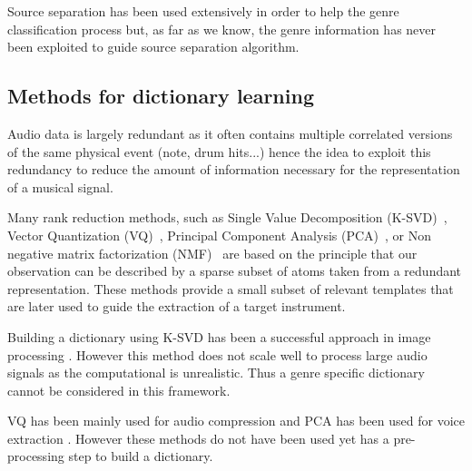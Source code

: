\documentclass{article}
\begin{document}
Source separation has been used extensively in order to help the genre classification process \cite{rump2010autoregressive,lampropoulos2005musical} but, as far as we know, the genre information has never been exploited to guide source separation algorithm. 


\subsection{Methods for dictionary learning}


Audio data is largely redundant as it often contains multiple correlated versions of the same physical event (note, drum hits...) \cite{tovsic2011dictionary} hence the idea to exploit this redundancy to reduce the amount of information necessary for the representation of a musical signal. 

Many rank reduction methods, such as Single Value Decomposition (K-SVD)~\cite{aharon2006img}, Vector Quantization (VQ)~\cite{gersho2012vector}, Principal Component Analysis (PCA)~\cite{huang2012singing}, or Non negative matrix factorization (NMF)~\cite{Smaragdis03} are based on the principle that our observation can be described by a sparse subset of atoms taken from a redundant representation. These methods provide a small subset of relevant templates that are later used to guide the extraction of a target instrument. 


Building a dictionary using K-SVD has been a successful approach in image processing \cite{zhang2010discriminative}. However this method does not scale well to process large audio signals as the computational is unrealistic. Thus a genre specific dictionary cannot be considered in this framework.

VQ has been mainly used for audio compression \cite{gersho2012vector} and PCA has been used for voice extraction \cite{huang2012singing}. However these methods do not have been used yet has a pre-processing step to build a dictionary. 
\end{document}
